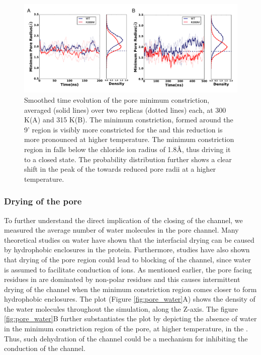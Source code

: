 \documentclass[9pt,twocolumn,twoside,lineno]{pnas-new}
\begin{document}
\begin{figure}
\begin{center}
\includegraphics[width = .5\textwidth]{figures/min_pore_radd.pdf}
\end{center}
\caption{Smoothed time evolution of the pore minimum constriction, averaged (solid lines) over two replicas (dotted lines) each, at 300 K(A) and 315 K(B). The minimum constriction, formed around the 9' region is visibly more constricted for the \MTs and this reduction is more pronounced at higher temperature. The minimum constriction region in \MT falls below the chloride ion radius of 1.8\AA, thus driving it to a closed state. The probability distribution further shows a clear shift in the peak of the \MTs towards reduced pore radii at a higher temperature.}
\label{fig:pore-evolution}
\end{figure}

\subsubsection*{Drying of the pore}
To further understand the direct implication of the closing of the \MT channel, we measured the average number of water molecules in the pore channel. Many theoretical studies on water have shown that the interfacial drying can be caused by hydrophobic enclosures in the protein\cite{Zhu2010}. Furthermore, studies\cite{Zhu2012,Dong2013} have also shown that drying of the pore region could lead to blocking of the channel, since water is assumed to facilitate conduction of ions. As mentioned earlier, the pore facing residues in \GABAA are dominated by non-polar residues and this causes intermittent drying of the channel when the minimum constriction region comes closer to form hydrophobic enclosures. The plot (Figure \ref{fig:pore_water}A) shows the density of the water molecules throughout the simulation, along the Z-axis. The figure \ref{fig:pore_water}B further substantiates the plot by depicting the absence of water in the minimum constriction region of the pore, at higher temperature, in the \MTs . Thus, such dehydration of the channel could be a mechanism for inhibiting the conduction of the channel.
\end{document}

